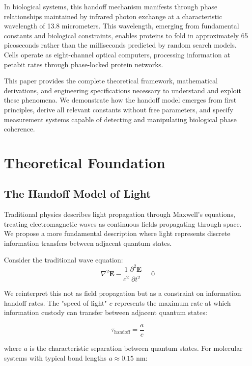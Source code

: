 \documentclass[12pt,twocolumn]{article}
\begin{document}
In biological systems, this handoff mechanism manifests through phase relationships maintained by infrared photon exchange at a characteristic wavelength of 13.8 micrometers. This wavelength, emerging from fundamental constants and biological constraints, enables proteins to fold in approximately 65 picoseconds rather than the milliseconds predicted by random search models. Cells operate as eight-channel optical computers, processing information at petabit rates through phase-locked protein networks.

This paper provides the complete theoretical framework, mathematical derivations, and engineering specifications necessary to understand and exploit these phenomena. We demonstrate how the handoff model emerges from first principles, derive all relevant constants without free parameters, and specify measurement systems capable of detecting and manipulating biological phase coherence.

\section{Theoretical Foundation}

\subsection{The Handoff Model of Light}

Traditional physics describes light propagation through Maxwell's equations, treating electromagnetic waves as continuous fields propagating through space. We propose a more fundamental description where light represents discrete information transfers between adjacent quantum states.

Consider the traditional wave equation:
\begin{equation}
\nabla^2 \mathbf{E} - \frac{1}{c^2} \frac{\partial^2 \mathbf{E}}{\partial t^2} = 0
\end{equation}

We reinterpret this not as field propagation but as a constraint on information handoff rates. The "speed of light" $c$ represents the maximum rate at which information custody can transfer between adjacent quantum states:

\begin{equation}
\tau_{\text{handoff}} = \frac{a}{c}
\end{equation}

where $a$ is the characteristic separation between quantum states. For molecular systems with typical bond lengths $a \approx 0.15$ nm:
\end{document}
